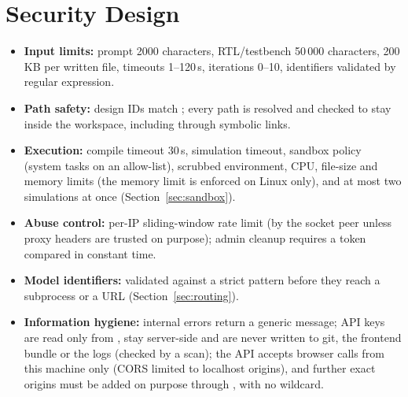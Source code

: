 \section{Security Design}
\label{sec:security}
\begin{itemize}
\item \textbf{Input limits:} prompt 2000 characters, RTL/testbench 50\,000 characters, 200\,KB per written file, timeouts 1--120\,s, iterations 0--10, identifiers validated by regular expression.
\item \textbf{Path safety:} design IDs match ; every path is resolved and checked to stay inside the workspace, including through symbolic links.
\item \textbf{Execution:} compile timeout 30\,s, simulation timeout, sandbox policy (system tasks on an allow-list), scrubbed environment, CPU, file-size and memory limits (the memory limit is enforced on Linux only), and at most two simulations at once (Section~\ref{sec:sandbox}).
\item \textbf{Abuse control:} per-IP sliding-window rate limit (by the socket peer unless proxy headers are trusted on purpose); admin cleanup requires a token compared in constant time.
\item \textbf{Model identifiers:} validated against a strict pattern before they reach a subprocess or a URL (Section~\ref{sec:routing}).
\item \textbf{Information hygiene:} internal errors return a generic message; API keys are read only from , stay server-side and are never written to git, the frontend bundle or the logs (checked by a scan); the API accepts browser calls from this machine only (CORS limited to localhost origins), and further exact origins must be added on purpose through , with no wildcard.
\end{itemize}
